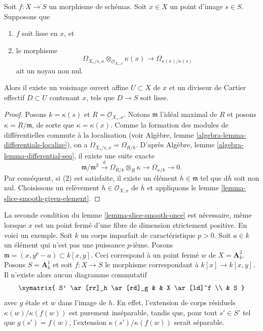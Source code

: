 \begin{lemma}
\label{lemma-slice-smooth-once}
Soit $f : X \to S$ un morphisme de schémas.
Soit $x \in X$ un point d'image $s \in S$.
Supposons que
\begin{enumerate}
\item $f$ soit lisse en $x$, et
\item le morphisme
$$
\Omega_{X_s/s, x} \otimes_{\mathcal{O}_{X_s, x}} \kappa(x)
\longrightarrow
\Omega_{\kappa(x)/\kappa(s)}
$$
ait un noyau non nul.
\end{enumerate}
Alors il existe un voisinage ouvert affine $U \subset X$ de $x$
et un diviseur de Cartier effectif $D \subset U$ contenant $x$, tels que
$D \to S$ soit lisse.
\end{lemma}

\begin{proof}
Posons $k = \kappa(s)$ et $R = \mathcal{O}_{X_s, x}$.
Notons $\mathfrak m$ l'idéal maximal de $R$ et posons
$\kappa = R/\mathfrak m$, de sorte que $\kappa = \kappa(x)$.
Comme la formation des modules de différentielles commute à la localisation (voir
Algèbre, lemme \ref{algebra-lemma-differentials-localize}),
on a $\Omega_{X_s/s, x} = \Omega_{R/k}$. D'après
Algèbre, lemme \ref{algebra-lemma-differential-seq},
il existe une suite exacte
$$
\mathfrak m/\mathfrak m^2 \xrightarrow{\text{d}}
\Omega_{R/k} \otimes_R \kappa \to
\Omega_{\kappa/k} \to 0.
$$
Par conséquent, si (2) est satisfaite, il existe un élément $\overline{h} \in \mathfrak m$
tel que $\text{d}\overline{h}$ soit non nul. Choisissons un relèvement
$h \in \mathcal{O}_{X, x}$ de $\overline{h}$ et appliquons le
lemme \ref{lemma-slice-smooth-given-element}.
\end{proof}

\begin{remark}
\label{remark-necessary-condition-slice-smooth}
La seconde condition du
lemme \ref{lemma-slice-smooth-once}
est nécessaire, même lorsque $x$ est un point fermé d'une fibre de dimension
strictement positive. En voici un exemple. Soit $k$ un corps
imparfait de caractéristique $p > 0$. Soit $a \in k$ un
élément qui n'est pas une puissance $p$-ième. Posons
$\mathfrak m = (x, y^p - a) \subset k[x, y]$. Ceci correspond à un point fermé
$w$ de $X = \mathbf{A}^2_k$. Posons $S = \mathbf{A}^1_k$ et
soit $f : X \to S$ le morphisme correspondant à $k[x] \to k[x, y]$.
Il n'existe alors aucun diagramme commutatif
$$
\xymatrix{
S' \ar[rr]_h \ar[rd]_g & & X \ar[ld]^f \\
& S
}
$$
avec $g$ \'etale et $w$ dans l'image de $h$. En effet, l'extension de corps
résiduels $\kappa(w)/\kappa(f(w))$ est purement inséparable,
tandis que, pour tout $s' \in S'$ tel que $g(s') = f(w)$, l'extension
$\kappa(s')/\kappa(f(w))$ serait séparable.
\end{remark}


